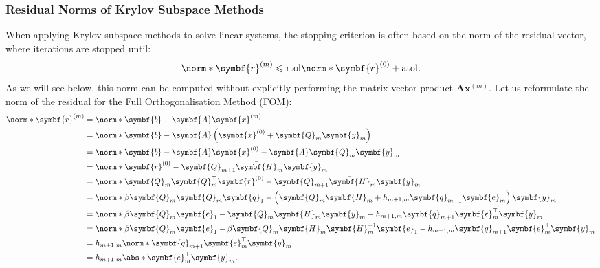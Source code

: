 \documentclass{article}
\begin{document}
\subsubsection{Residual Norms of Krylov Subspace Methods}
When applying Krylov subspace methods to solve linear systems, the
stopping criterion is often based on the norm of the residual vector,
where iterations are stopped until:
\begin{equation*}
    \norm*{\symbf{r}^{\left( m \right)}} \leqslant \mathrm{rtol} \norm*{\symbf{r}^{\left( 0 \right)}} + \mathrm{atol}.
\end{equation*}
As we will see below, this norm can be computed without explicitly
performing the matrix-vector product \(\symbf{A} \symbf{x}^{\left( m \right)}\).
Let us reformulate the norm of the residual for the Full
Orthogonalisation Method (FOM):
\begin{align*}
    \norm*{\symbf{r}^{\left( m \right)}} & = \norm*{\symbf{b} - \symbf{A} \symbf{x}^{\left( m \right)}}                                                                                                  \\
                                         & = \norm*{\symbf{b} - \symbf{A} \left( \symbf{x}^{\left( 0 \right)} + \symbf{Q}_m \symbf{y}_m \right)}                                                         \\
                                         & = \norm*{\symbf{b} - \symbf{A} \symbf{x}^{\left( 0 \right)} - \symbf{A} \symbf{Q}_m \symbf{y}_m}                                                              \\
                                         & = \norm*{\symbf{r}^{\left( 0 \right)} - \symbf{Q}_{m+1} \bar{\symbf{H}}_m \symbf{y}_m}                                                                        \\
                                         & = \norm*{\symbf{Q}_m \symbf{Q}_m^\top \symbf{r}^{\left( 0 \right)} - \symbf{Q}_{m+1} \bar{\symbf{H}}_m \symbf{y}_m}                                           \\
                                         & = \norm*{\beta \symbf{Q}_m \symbf{Q}_m^\top \symbf{q}_1 - \left( \symbf{Q}_m \symbf{H}_m + h_{m+1,m} \symbf{q}_{m+1} \symbf{e}_m^\top \right) \symbf{y}_m}    \\
                                         & = \norm*{\beta \symbf{Q}_m \symbf{e}_1 - \symbf{Q}_m \symbf{H}_m \symbf{y}_m - h_{m+1,m} \symbf{q}_{m+1} \symbf{e}_m^\top \symbf{y}_m}                        \\
                                         & = \norm*{\beta \symbf{Q}_m \symbf{e}_1 - \beta \symbf{Q}_m \symbf{H}_m \symbf{H}_m^{-1} \symbf{e}_1 - h_{m+1,m} \symbf{q}_{m+1} \symbf{e}_m^\top \symbf{y}_m} \\
                                         & = h_{m+1,m} \norm*{\symbf{q}_{m+1} \symbf{e}_m^\top \symbf{y}_m}                                                                                              \\
                                         & = h_{m+1,m} \abs*{\symbf{e}_m^\top \symbf{y}_m}.
\end{align*}
\end{document}
